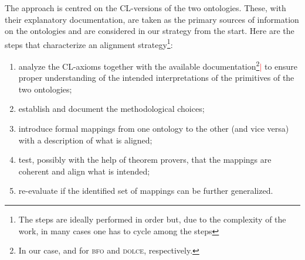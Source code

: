 \documentclass[ao]{iosart2x}
\newcommand{\nb}[1]{\textcolor{red}{$|$}\marginpar{\hspace*{-0cm}\parbox{20mm}{\scriptsize\raggedright\textcolor{red}{#1}}}}
\newcommand{\dolce}{{\textsc{dolce}}}
\newcommand{\bfo}{{\textsc{bfo}}}
\begin{document}
The approach is centred on the CL-versions of the two ontologies. These, with their explanatory documentation, are taken as the primary sources of information on the ontologies and are considered in our strategy from the start. 
Here are the steps that characterize an alignment strategy\footnote{The steps are ideally performed in order but, due to the complexity of the work, in many cases one has to cycle among the steps}:
\begin{enumerate}[({\bf S}1)]
\item analyze the CL-axioms together with the available documentation\footnote{In our case, \citep{barryBasicFormalOntology2015} and \citep{D18} for {\bfo} and {\dolce}, respectively.}\nb{CM: non sono riuscito a trovare dove è disponibila la versione aggiornata che spiega BFO 2020 che abbiamo usato noi} to ensure proper understanding of the intended interpretations of the primitives of the two ontologies; %
 \item establish and document the methodological choices;
\item introduce formal mappings from one ontology to the other (and vice versa) with a description of what is aligned;
\item test, possibly with the help of theorem provers, that the  mappings are coherent and align what is intended;
\item re-evaluate if the identified set of mappings can be further generalized. %
\end{enumerate}
\end{document}
